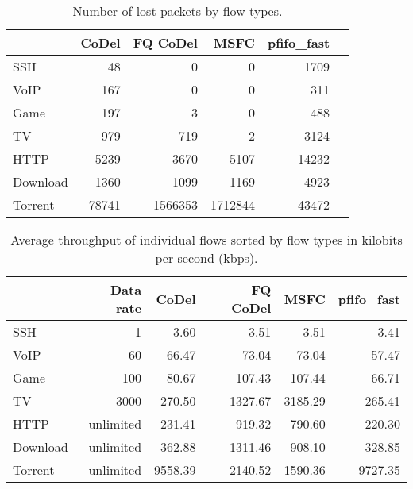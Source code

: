\begin{table}
	\centering
	
	\begin{tabular}{@{}l|rrrrr@{}}
		\toprule
		         & {CoDel} & {FQ CoDel} &  {MSFC} & {pfifo\_fast} &  \\ \midrule
		SSH      &      48 &          0 &       0 &          1709 &  \\
		VoIP     &     167 &          0 &       0 &           311 &  \\
		Game     &     197 &          3 &       0 &           488 &  \\
		TV       &     979 &        719 &       2 &          3124 &  \\
		HTTP     &    5239 &       3670 &    5107 &         14232 &  \\
		Download &    1360 &       1099 &    1169 &          4923 &  \\
		Torrent  &   78741 &    1566353 & 1712844 &         43472 &  \\ \bottomrule
	\end{tabular}
	\caption{Number of lost packets by flow types.}
	\label{tab:loss_A}
\end{table}

\begin{table}
	\centering
	
	\begin{tabular}{@{}l|rrrrr@{}}
		\toprule
		         & {Data rate} & {CoDel} & {FQ CoDel} &  {MSFC} & {pfifo\_fast} \\ \midrule
		SSH      &           1 &    3.60 &       3.51 &    3.51 &          3.41 \\
		VoIP     &          60 &   66.47 &      73.04 &   73.04 &         57.47 \\
		Game     &         100 &   80.67 &     107.43 &  107.44 &         66.71 \\
		TV       &        3000 &  270.50 &    1327.67 & 3185.29 &        265.41 \\
		HTTP     &   unlimited &  231.41 &     919.32 &  790.60 &        220.30 \\
		Download &   unlimited &  362.88 &    1311.46 &  908.10 &        328.85 \\
		Torrent  &   unlimited & 9558.39 &    2140.52 & 1590.36 &       9727.35 \\ \bottomrule
	\end{tabular}
	\caption{Average throughput of individual flows sorted by flow types in kilobits per second (kbps).}
	\label{tab:throughput_A}
\end{table}









